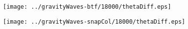 \documentclass{article}
\begin{document}
\texttt{[image: ../gravityWaves-btf/18000/thetaDiff.eps]}

\texttt{[image: ../gravityWaves-snapCol/18000/thetaDiff.eps]}
\end{document}

